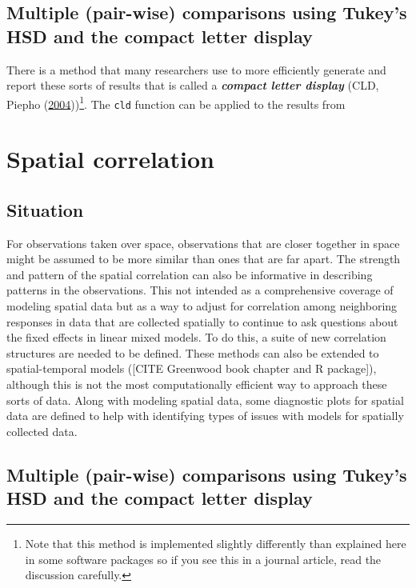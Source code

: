 \documentclass[
]{book}
\begin{document}
\hypertarget{section10-4}{%
\section{Multiple (pair-wise) comparisons using Tukey's HSD and the compact letter display}\label{section10-4}}

\indent There is a method that many researchers use to more efficiently generate and
report these sorts of results that is called a \textbf{\emph{compact letter display}} 
(CLD, Piepho (\protect\hyperlink{ref-Piepho2004}{2004}))\footnote{Note that this method is implemented slightly differently than explained here in some software packages so if you see this in a journal article, read the discussion carefully.}. The \texttt{cld} function can be applied to the results from

\hypertarget{chapter11}{%
\chapter{Spatial correlation}\label{chapter11}}

\hypertarget{section11-1}{%
\section{Situation}\label{section11-1}}

For observations taken over space, observations that are closer together in space might be assumed to be more similar than ones that are far apart. The strength and pattern of the spatial correlation can also be informative in describing patterns in the observations. This not intended as a comprehensive coverage of modeling spatial data but as a way to adjust for correlation among neighboring responses in data that are collected spatially to continue to ask questions about the fixed effects in linear mixed models. To do this, a suite of new correlation structures are needed to be defined. These methods can also be extended to spatial-temporal models ({[}CITE Greenwood book chapter and R package{]}), although this is not the most computationally efficient way to approach these sorts of data. Along with modeling spatial data, some diagnostic plots for spatial data are defined to help with identifying types of issues with models for spatially collected data.

\hypertarget{section11-2}{%
\section{Multiple (pair-wise) comparisons using Tukey's HSD and the compact letter display}\label{section11-2}}
\end{document}
